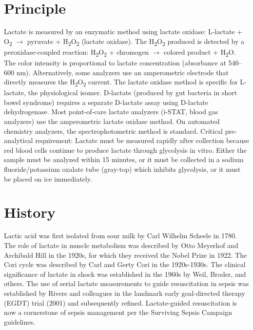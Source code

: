 \section*{Principle}
Lactate is measured by an enzymatic method using lactate oxidase: L-lactate + O\textsubscript{2} $\rightarrow$ pyruvate + H\textsubscript{2}O\textsubscript{2} (lactate oxidase). The H\textsubscript{2}O\textsubscript{2} produced is detected by a peroxidase-coupled reaction: H\textsubscript{2}O\textsubscript{2} + chromogen $\rightarrow$ colored product + H\textsubscript{2}O. The color intensity is proportional to lactate concentration (absorbance at 540--600 nm). Alternatively, some analyzers use an amperometric electrode that directly measures the H\textsubscript{2}O\textsubscript{2} current. The lactate oxidase method is specific for L-lactate, the physiological isomer. D-lactate (produced by gut bacteria in short bowel syndrome) requires a separate D-lactate assay using D-lactate dehydrogenase. Most point-of-care lactate analyzers (i-STAT, blood gas analyzers) use the amperometric lactate oxidase method. On automated chemistry analyzers, the spectrophotometric method is standard. Critical pre-analytical requirement: Lactate must be measured rapidly after collection because red blood cells continue to produce lactate through glycolysis in vitro. Either the sample must be analyzed within 15 minutes, or it must be collected in a sodium fluoride/potassium oxalate tube (gray-top) which inhibits glycolysis, or it must be placed on ice immediately.

\section*{History}
Lactic acid was first isolated from sour milk by Carl Wilhelm Scheele in 1780. The role of lactate in muscle metabolism was described by Otto Meyerhof and Archibald Hill in the 1920s, for which they received the Nobel Prize in 1922. The Cori cycle was described by Carl and Gerty Cori in the 1920s-1930s. The clinical significance of lactate in shock was established in the 1960s by Weil, Broder, and others. The use of serial lactate measurements to guide resuscitation in sepsis was established by Rivers and colleagues in the landmark early goal-directed therapy (EGDT) trial (2001) and subsequently refined. Lactate-guided resuscitation is now a cornerstone of sepsis management per the Surviving Sepsis Campaign guidelines.

